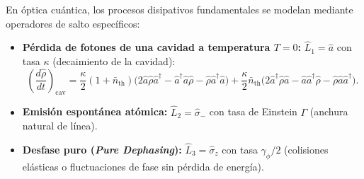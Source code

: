 \documentclass[11pt,a4paper,twoside]{report}
\theoremstyle{definition}
\theoremstyle{plain}
\theoremstyle{remark}
\newcommand{\op}[1]{\hat{#1}}
\begin{document}
En óptica cuántica, los procesos disipativos fundamentales se modelan mediante operadores de salto específicos:
\begin{itemize}
    \item \textbf{Pérdida de fotones de una cavidad a temperatura $T=0$:} $\op{L}_1 = \op{a}$ con tasa $\kappa$ (decaimiento de la cavidad):
    \begin{equation}
        \left(\frac{d\op{\rho}}{dt}\right)_{\text{cav}} = \frac{\kappa}{2}(1 + \bar{n}_{\text{th}})\big(2\op{a}\op{\rho}\op{a}^\dagger - \op{a}^\dagger\op{a}\op{\rho} - \op{\rho}\op{a}^\dagger\op{a}\big) + \frac{\kappa}{2}\bar{n}_{\text{th}}\big(2\op{a}^\dagger\op{\rho}\op{a} - \op{a}\op{a}^\dagger\op{\rho} - \op{\rho}\op{a}\op{a}^\dagger\big).
    \end{equation}
    \item \textbf{Emisión espontánea atómica:} $\op{L}_2 = \op{\sigma}_-$ con tasa de Einstein $\Gamma$ (anchura natural de línea).
    \item \textbf{Desfase puro (\textit{Pure Dephasing}):} $\op{L}_3 = \op{\sigma}_z$ con tasa $\gamma_\phi / 2$ (colisiones elásticas o fluctuaciones de fase sin pérdida de energía).
\end{itemize}
\end{document}
